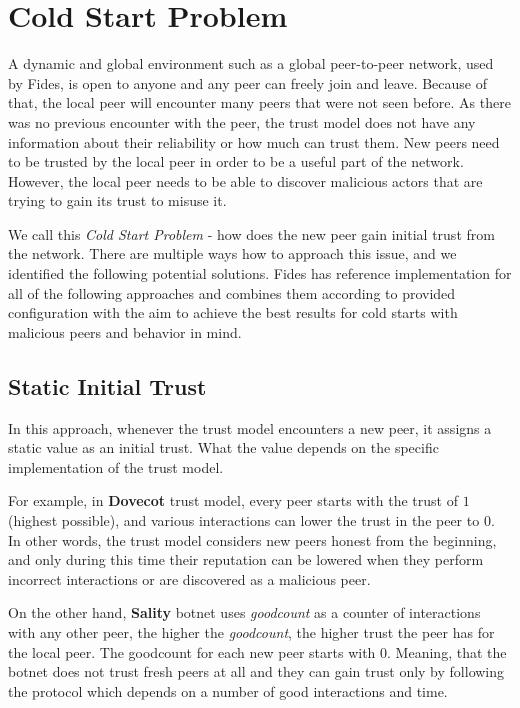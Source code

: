 \section{Cold Start Problem}
\label{sec:cold-start-problem}
A dynamic and global environment such as a global peer-to-peer network, used by Fides, is open to anyone and any peer can freely join and leave. Because of that, the local peer will encounter many peers that were not seen before. As there was no previous encounter with the peer, the trust model does not have any information about their reliability or how much can trust them. 
New peers need to be trusted by the local peer in order to be a useful part of the network. However, the local peer needs to be able to discover malicious actors that are trying to gain its trust to misuse it.

We call this \textit{Cold Start Problem} - how does the new peer gain initial trust from the network. There are multiple ways how to approach this issue, and we identified the following potential solutions. 
Fides has reference implementation for all of the following approaches and combines them according to provided configuration with the aim to achieve the best results for cold starts with malicious peers and behavior in mind.

\subsection{Static Initial Trust}
\label{subsec:static-initial-trust}
In this approach, whenever the trust model encounters a new peer, it assigns a static value as an initial trust. What the value depends on the specific implementation of the trust model.

For example, in \textbf{Dovecot} trust model, every peer starts with the trust of $1$ (highest possible), and various interactions can lower the trust in the peer to $0$. In other words, the trust model considers new peers honest from the beginning, and only during this time their reputation can be lowered when they perform incorrect interactions or are discovered as a malicious peer.

On the other hand, \textbf{Sality} botnet uses \textit{goodcount} as a counter of interactions with any other peer, the higher the \textit{goodcount}, the higher trust the peer has for the local peer. The goodcount for each new peer starts with $0$. Meaning, that the botnet does not trust fresh peers at all and they can gain trust only by following the protocol which depends on a number of good interactions and time.

